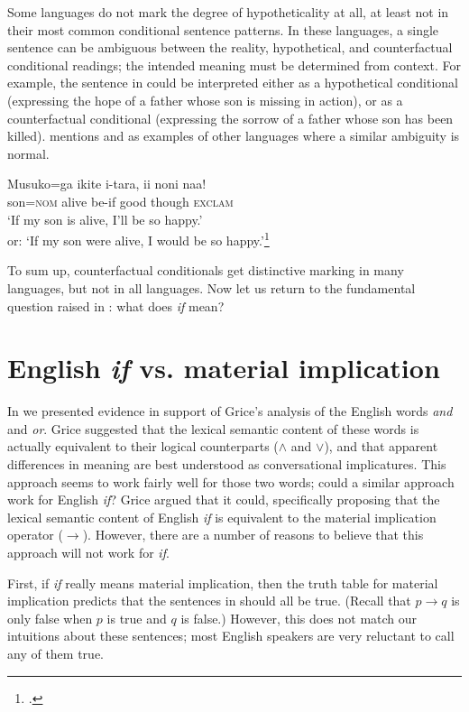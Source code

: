 Some languages do not mark the degree of hypotheticality at all, at least not in their most common conditional sentence patterns. In these languages, a single sentence can be ambiguous between the reality, hypothetical, and counterfactual conditional readings; the intended meaning must be determined from context. For example, the  sentence in  could be interpreted either as a hypothetical conditional (expressing the hope of a father whose son is missing in action), or as a counterfactual conditional (expressing the sorrow of a father whose son has been killed). \citet{Comrie1986} mentions  and  as examples of other languages where a similar ambiguity is normal.


\ea \label{ex:19.20}
\gll Musuko=ga  ikite  i-tara,  ii  noni  naa!\\
son=\textsc{nom}  alive  be-if  good  though  \textsc{exclam}\\
\glt ‘If my son is alive, I’ll be so happy.’\\
or: ‘If my son were alive, I would be so happy.’\footnote{\citet[627]{Akatsuka1985}.}
\z


To sum up, counterfactual conditionals get distinctive marking in many languages, but not in all languages. Now let us return to the fundamental question raised in : what does \textit{if} mean?


\section{English \textit{if} vs. material implication}\label{sec:19.4}

In  we presented evidence in support of Grice’s analysis of the English words \textit{and} and \textit{or}. Grice suggested that the lexical semantic content of these words is actually equivalent to their logical counterparts ($\wedge$ and $\vee$), and that apparent differences in meaning are best understood as conversational implicatures. This approach seems to work fairly well for those two words; could a similar approach work for English \textit{if}? Grice argued that it could, specifically proposing that the lexical semantic content of English \textit{if} is equivalent to the material implication operator ($\rightarrow$). However, there are a number of reasons to believe that this approach will not work for \textit{if}.



First, if \textit{if} really means material implication, then the truth table for material implication predicts that the sentences in  should all be true. (Recall that $p\rightarrow q$ is only false when $p$ is true and $q$ is false.) However, this does not match our intuitions about these sentences; most English speakers are very reluctant to call any of them true.


